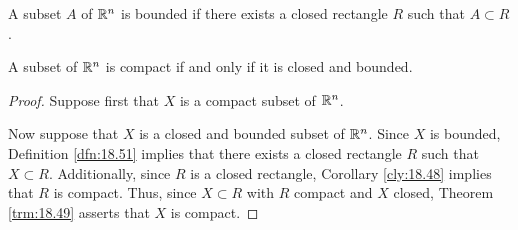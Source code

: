 \documentclass[../main.tex]{subfiles}
\begin{document}
\begin{definition}\label{dfn:18.51}
    A subset $A$ of $\mathbb{R}^n$ is bounded if there exists a closed rectangle $R$ such that $A\subset R$.
\end{definition}

\begin{theorem}\label{trm:18.52}
    A subset of $\mathbb{R}^n$ is compact if and only if it is closed and bounded.
    \begin{proof}
        Suppose first that $X$ is a compact subset of $\mathbb{R}^n$.\par
        Now suppose that $X$ is a closed and bounded subset of $\mathbb{R}^n$. Since $X$ is bounded, Definition \ref{dfn:18.51} implies that there exists a closed rectangle $R$ such that $X\subset R$. Additionally, since $R$ is a closed rectangle, Corollary \ref{cly:18.48} implies that $R$ is compact. Thus, since $X\subset R$ with $R$ compact and $X$ closed, Theorem \ref{trm:18.49} asserts that $X$ is compact.
    \end{proof}
\end{theorem}
\end{document}
